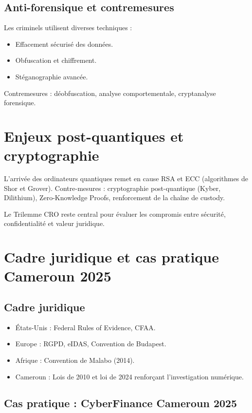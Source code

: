 \documentclass[12pt,a4paper]{article}
\begin{document}
\subsection{Anti-forensique et contremesures}

Les criminels utilisent diverses techniques :
\begin{itemize}
    \item Effacement sécurisé des données.
    \item Obfuscation et chiffrement.
    \item Stéganographie avancée.
\end{itemize}

Contremesures : déobfuscation, analyse comportementale, cryptanalyse forensique.

\section{Enjeux post-quantiques et cryptographie}

L’arrivée des ordinateurs quantiques remet en cause RSA et ECC (algorithmes de Shor et Grover). 
Contre-mesures : cryptographie post-quantique (Kyber, Dilithium), Zero-Knowledge Proofs, renforcement de la chaîne de custody.

Le Trilemme CRO reste central pour évaluer les compromis entre sécurité, confidentialité et valeur juridique.

\section{Cadre juridique et cas pratique Cameroun 2025}

\subsection{Cadre juridique}

\begin{itemize}
    \item États-Unis : Federal Rules of Evidence, CFAA.
    \item Europe : RGPD, eIDAS, Convention de Budapest.
    \item Afrique : Convention de Malabo (2014).
    \item Cameroun : Lois de 2010 et loi de 2024 renforçant l’investigation numérique.
\end{itemize}

\subsection{Cas pratique : CyberFinance Cameroun 2025}
\end{document}
